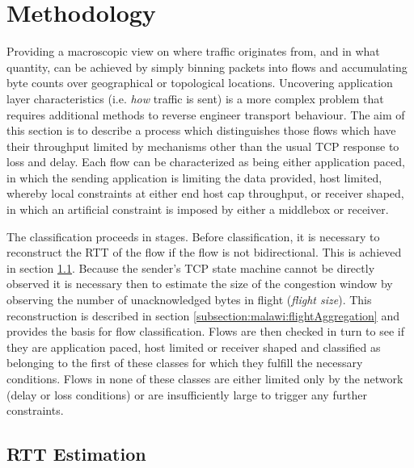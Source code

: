 \section{Methodology}

Providing a macroscopic view on where traffic originates from, and in what quantity, can be achieved by simply binning packets into flows and accumulating byte counts over geographical or topological locations. 
Uncovering application layer characteristics (i.e. \textit{how} traffic is sent) is a more complex problem that requires additional methods to reverse engineer transport behaviour.
The aim of this section is to describe a process which distinguishes those flows which have their throughput limited by mechanisms other than the usual \ac{TCP} response to loss and delay.
Each flow can be characterized as being either application paced, in which the sending application is limiting the data provided, host limited, whereby local constraints at either end host cap throughput, or receiver shaped, in which an artificial constraint is imposed by either a middlebox or receiver.

The classification proceeds in stages. 
Before classification, it is necessary to reconstruct the RTT of the flow if the flow is not bidirectional.  
This is achieved in section \ref{subsection:malawi:PeriodicEnhancement}. 
Because the sender's TCP state machine cannot be directly observed it is necessary then to estimate the size of the congestion window by observing the number of unacknowledged bytes in flight (\textit{flight size}).
This reconstruction is described in section \ref{subsection:malawi:flightAggregation} and provides the basis for flow classification. 
Flows are then checked in turn to see if they are application paced, host limited or receiver shaped and classified as belonging to the first of these classes for which they fulfill the necessary conditions.
Flows in none of these classes are either limited only by the network (delay or loss conditions) or are insufficiently large to trigger any further constraints.

\subsection{RTT Estimation}
\label{subsection:malawi:PeriodicEnhancement}

